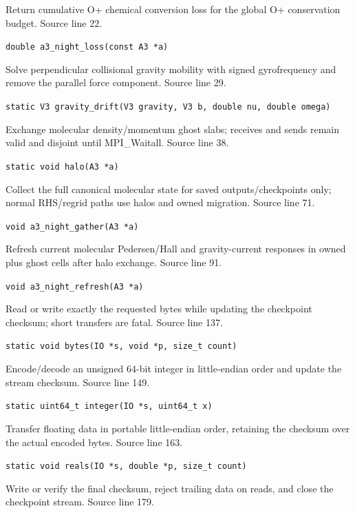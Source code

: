 \begin{description}[style=nextline,leftmargin=0pt,labelindent=0pt,labelwidth=0pt,labelsep=0pt]
\item[\texttt{a3\_night\_loss}] Return cumulative O+ chemical conversion loss for the global O+ conservation budget. Source line 22.\par
{\small\nolinkurl{double a3_night_loss(const A3 *a)}}
\item[\texttt{gravity\_drift}] Solve perpendicular collisional gravity mobility with signed gyrofrequency and remove the parallel force component. Source line 29.\par
{\small\nolinkurl{static V3 gravity_drift(V3 gravity, V3 b, double nu, double omega)}}
\item[\texttt{halo}] Exchange molecular density/momentum ghost slabs; receives and sends remain valid and disjoint until MPI\_Waitall. Source line 38.\par
{\small\nolinkurl{static void halo(A3 *a)}}
\item[\texttt{a3\_night\_gather}] Collect the full canonical molecular state for saved outputs/checkpoints only; normal RHS/regrid paths use halos and owned migration. Source line 71.\par
{\small\nolinkurl{void a3_night_gather(A3 *a)}}
\item[\texttt{a3\_night\_refresh}] Refresh current molecular Pedersen/Hall and gravity-current responses in owned plus ghost cells after halo exchange. Source line 91.\par
{\small\nolinkurl{void a3_night_refresh(A3 *a)}}
\item[\texttt{bytes}] Read or write exactly the requested bytes while updating the checkpoint checksum; short transfers are fatal. Source line 137.\par
{\small\nolinkurl{static void bytes(IO *s, void *p, size_t count)}}
\item[\texttt{integer}] Encode/decode an unsigned 64-bit integer in little-endian order and update the stream checksum. Source line 149.\par
{\small\nolinkurl{static uint64_t integer(IO *s, uint64_t x)}}
\item[\texttt{reals}] Transfer floating data in portable little-endian order, retaining the checksum over the actual encoded bytes. Source line 163.\par
{\small\nolinkurl{static void reals(IO *s, double *p, size_t count)}}
\item[\texttt{finish}] Write or verify the final checksum, reject trailing data on reads, and close the checkpoint stream. Source line 179.\par

\end{description}
